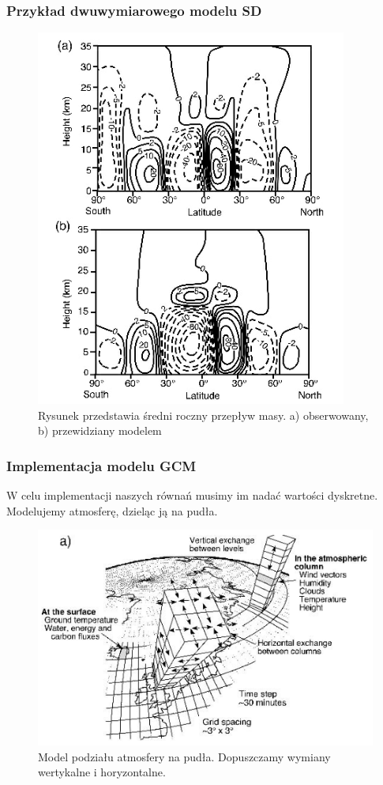 \documentclass{beamer}
\begin{document}
\begin{frame}
	\frametitle{Przykład dwuwymiarowego modelu SD}
	
	\begin{figure}[h]
		\begin{center}
			\includegraphics[width=0.4\linewidth]{images/2D_model.png}
			\caption{Rysunek przedstawia średni roczny przepływ masy. a) obserwowany, b) przewidziany modelem\cite{b1}}
		\end{center}
	\end{figure}
	
\end{frame}


\begin{frame}
	\frametitle{Implementacja modelu GCM}
	W celu implementacji naszych równań musimy im nadać wartości dyskretne.
	Modelujemy atmosferę, dzieląc ją na pudła.
	
	\begin{figure}[h]
		\begin{center}
			\includegraphics[width=0.7\linewidth]{images/box.png}
			\caption{Model podziału atmosfery na pudła. Dopuszczamy wymiany wertykalne i horyzontalne.\cite{b1}}
		\end{center}
	\end{figure}
	
\end{frame}
\end{document}
